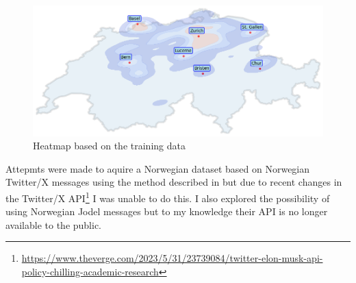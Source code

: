 \begin{figure}
    \centering
    \includegraphics[width=\textwidth]{./figs/heatmap.png}
    \caption{Heatmap based on the training data}
    \label{fig:heatmap}
\end{figure}

Attepmts were made to aquire a Norwegian dataset based on Norwegian Twitter/X messages using the method described in \cite{ljubesicTweetGeoToolCollecting2016} but due to recent changes in the Twitter/X API\footnote{\url{https://www.theverge.com/2023/5/31/23739084/twitter-elon-musk-api-policy-chilling-academic-research}} I was unable to do this. I also explored the possibility of using Norwegian Jodel messages but to my knowledge their API is no longer available to the public.